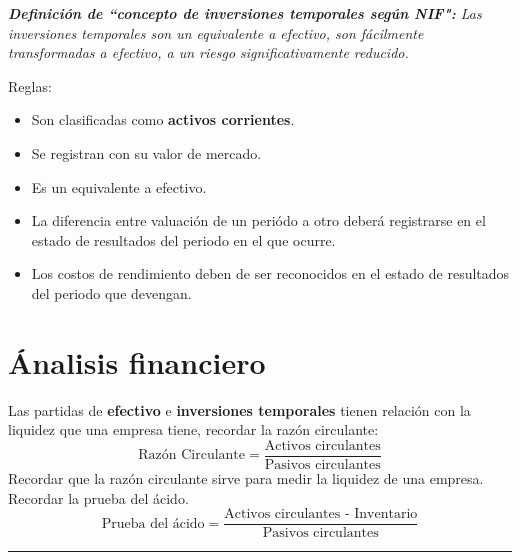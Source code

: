 \documentclass{article}
\begin{document}
\emph{\textbf{Definición de ``concepto de inversiones temporales según NIF":} Las inversiones temporales son un equivalente a efectivo, son fácilmente transformadas a efectivo, a un riesgo significativamente reducido.}

Reglas:
\begin{itemize}
    \item Son clasificadas como \textbf{activos corrientes}.
    \item Se registran con su valor de mercado.
    \item Es un equivalente a efectivo.
    \item La diferencia entre valuación de un periódo a otro deberá registrarse en el estado de resultados del periodo en el que ocurre.
    \item Los costos de rendimiento deben de ser reconocidos en el estado de resultados del periodo que devengan.
\end{itemize}

\section{Ánalisis financiero}
Las partidas de \textbf{efectivo} e \textbf{inversiones temporales} tienen relación con la liquidez que una empresa tiene, recordar la razón circulante:
\[
  \text{Razón Circulante} = \frac{\text{Activos circulantes}}{\text{Pasivos circulantes}} 
\]
Recordar que la razón circulante sirve para medir la liquidez de una empresa.\newline 
Recordar la prueba del ácido.
\[
  \text{Prueba del ácido} = \frac{\text{Activos circulantes - Inventario}}{\text{Pasivos circulantes}} 
\]

\rule{16cm}{1pt}
\end{document}
